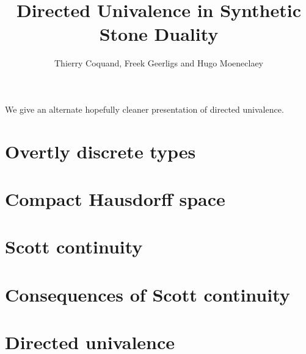 \documentclass{../util/zariski}
\title{Directed Univalence in Synthetic Stone Duality}
\begin{document}
\author{Thierry Coquand, Freek Geerligs and Hugo Moeneclaey}

\maketitle

We give an alternate hopefully cleaner presentation of directed univalence.

\tableofcontents

\section{Overtly discrete types}


\section{Compact Hausdorff space}


\section{Scott continuity}


\section{Consequences of Scott continuity}


\section{Directed univalence}


\printbibliography
\end{document}
